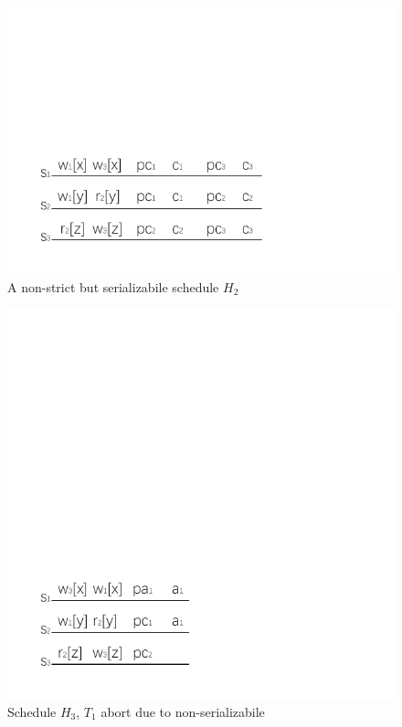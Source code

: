 \documentclass[conference]{IEEEtran}
\begin{document}
\begin{figure}[tbp]
  \centerline{\includegraphics[scale=0.8]{figure/schedule_non_strict.pdf}}
  \caption{A non-strict but serializabile schedule ${H_2}$}
  \label{fig:non_strict_example}
\end{figure}

\begin{figure}[tbp]
  \centerline{\includegraphics[scale=0.8]{figure/schedule_not_serializabile.pdf}}
  \caption{Schedule ${H_3}$, ${T_1}$ abort due to non-serializabile}
  \label{fig:schedule_abort_example}
\end{figure}
\end{document}
